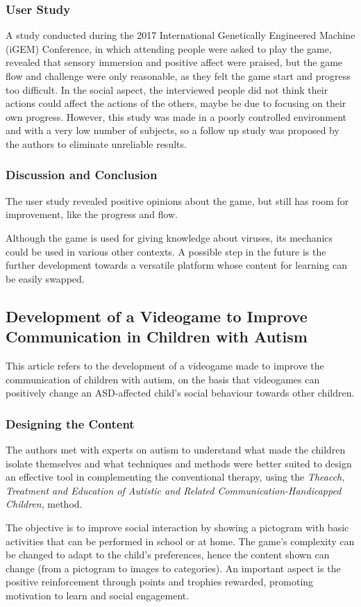 \documentclass[runningheads]{llncs}
\begin{document}
\subsubsection{User Study}
\par A study conducted during the 2017 International Genetically Engineered Machine (iGEM) Conference, in which attending people were asked to play the game, revealed that sensory immersion and positive affect were praised, but the game flow and challenge were only reasonable, as they felt the game start and progress too difficult. In the social aspect, the interviewed people did not think their actions could affect the actions of the others, maybe be due to focusing on their own progress. However, this study was made in a poorly controlled environment and with a very low number of subjects, so a follow up study was proposed by the authors to eliminate unreliable results.

\subsubsection{Discussion and Conclusion}
\par The user study revealed positive opinions about the game, but still has room for improvement, like the progress and flow.
\par Although the game is used for giving knowledge about viruses, its mechanics could be used in various other contexts. A possible step in the future is the further development towards a versatile platform whose content for learning can be easily swapped. 



\subsection{Development of a Videogame to Improve Communication in Children with Autism}
\par This article refers to the development of a videogame made to improve the communication of children with autism, on the basis that videogames can positively change an ASD-affected child's social behaviour towards other children.

\subsubsection{Designing the Content}
\par The authors met with experts on autism to understand what made the children isolate themselves and what techniques and methods were better suited to design an effective tool in complementing the conventional therapy, using the \textit{Theacch, Treatment and Education of Autistic and Related Communication-Handicapped Children}, method.
\par The objective is to improve social interaction by showing a pictogram with basic activities that can be performed in school or at home.
The game's complexity can be changed to adapt to the child's preferences, hence the content shown can change (from a pictogram to images to categories). An important aspect is the positive reinforcement through points and trophies rewarded, promoting motivation to learn and social engagement.
\end{document}
